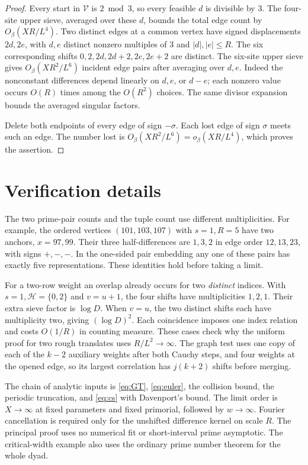 \documentclass[11pt]{article}
\begin{document}
\begin{proof}
Every start in $\mathcal V$ is $2\bmod3$, so every feasible $d$
is divisible by $3$. The four-site upper sieve, averaged over these
$d$, bounds the total edge count by $O_\beta(XR/L^4)$. Two distinct
edges at a common vertex have signed displacements $2d,2e$, with
$d,e$ distinct nonzero multiples of $3$ and $|d|,|e|\le R$.
The six corresponding shifts $0,2,2d,2d+2,2e,2e+2$ are distinct.
The six-site upper sieve gives $O_\beta(XR^2/L^6)$ incident edge
pairs after averaging over $d,e$. Indeed the nonconstant differences
depend linearly on $d,e$, or $d-e$; each nonzero value occurs
$O(R)$ times among the $O(R^2)$ choices. The same divisor expansion
bounds the averaged singular factors.

Delete both endpoints of every edge of sign $-\sigma$. Each lost
edge of sign $\sigma$ meets such an edge. The number lost is
$O_\beta(XR^2/L^6)=o_\beta(XR/L^4)$, which proves the assertion.
\end{proof}

\appendix
\section{Verification details}
The two prime-pair counts and the tuple count use different multiplicities.
For example, the ordered vertices \((101,103,107)\) with \(s=1,R=5\)
have two anchors, \(x=97,99\). Their three half-differences are \(1,3,2\)
in edge order \(12,13,23\), with signs \(+,-,-\).
In the one-sided pair embedding any one of these pairs has exactly five
representations. These identities hold before taking a limit.

For a two-row weight an overlap already occurs for two \emph{distinct}
indices. With \(s=1,\mathcal H=\{0,2\}\) and \(v=u+1\), the four shifts
have multiplicities \(1,2,1\). Their extra sieve factor is \(\log D\).
When \(v=u\), the two distinct shifts each have multiplicity two, giving
\((\log D)^2\). Each coincidence imposes one index relation and costs
\(O(1/R)\) in counting measure. These cases check why the uniform proof
for two rough translates uses \(R/L^2\to\infty\). The graph test uses one
copy of each of the \(k-2\) auxiliary weights after both Cauchy steps,
and four weights at the opened edge, so its largest correlation has
\(j(k+2)\) shifts before merging.

The chain of analytic inputs is \eqref{eq:GT}, \eqref{eq:euler},
the collision bound, the periodic truncation, and \eqref{eq:cs} with
Davenport's bound. The limit order is \(X\to\infty\) at fixed parameters
and fixed primorial, followed by \(w\to\infty\). Fourier cancellation is
required only for the unshifted difference kernel on scale \(R\).
The principal proof uses no numerical fit or short-interval prime
asymptotic. The critical-width example also uses the ordinary prime
number theorem for the whole dyad.
\end{document}
